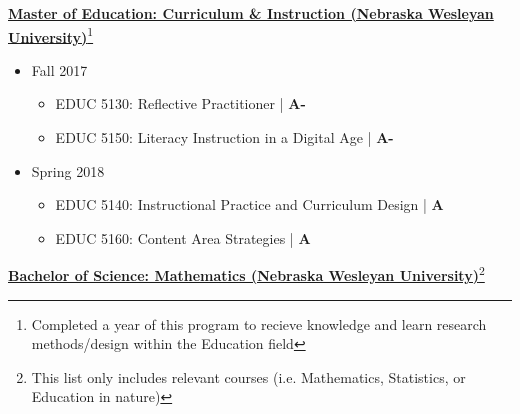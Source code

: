 \documentclass[10pt]{article}
\begin{document}
\underline{\textbf{Master of Education: Curriculum \& Instruction (Nebraska Wesleyan University)}}\footnote{Completed a year of this program to recieve knowledge and learn research methods/design within the Education field}

\begin{itemize}
\item Fall 2017
\begin{itemize}
\item EDUC 5130: Reflective Practitioner | \textbf{A-}
\item EDUC 5150: Literacy Instruction in a Digital Age | \textbf{A-}
\end{itemize}
\item Spring 2018
\begin{itemize}
\item EDUC 5140: Instructional Practice and Curriculum Design | \textbf{A}
\item EDUC 5160: Content Area Strategies | \textbf{A}
\end{itemize}
\end{itemize}

\newpage
\underline{\textbf{Bachelor of Science: Mathematics (Nebraska Wesleyan University)}}\footnote{This list only includes relevant courses (i.e. Mathematics, Statistics, or Education in nature)}
\end{document}

